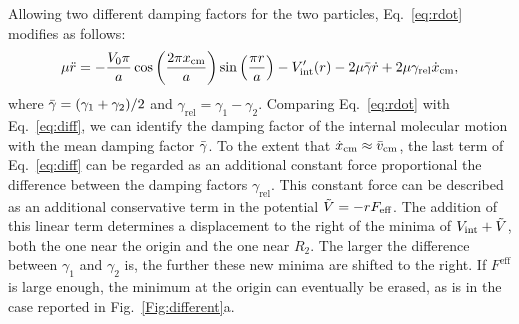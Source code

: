 
Allowing two different damping factors for the two particles, Eq.~\eqref{eq:rdot} modifies as follows:
\begin{equation}
    \mu\ddot{r} = -\frac{V_0\pi}{a}\cos \left(\frac{2\pi x_\text{cm}}{a}\right)\sin\left(\frac{\pi r}{a}\right)
    - V'_\text{int}(r) -2\mu\Bar{\gamma}\dot{r}+2\mu\gamma_\text{rel}\dot{x}_\text{cm},
    \label{eq:diff}
\end{equation}
where $\Bar{\gamma} = (\gamma_1+\gamma_2)/2$ and $\gamma_\text{rel} = \gamma_1-\gamma_2$.
Comparing Eq.~\eqref{eq:rdot} with Eq.~\eqref{eq:diff}, we can identify the damping factor of the internal molecular motion with the mean damping factor $\Bar{\gamma}$. To the extent that $\dot{x}_\text{cm} \approx \Bar{v}_\text{cm}$, the last term of Eq.~\eqref{eq:diff} can be regarded as an additional constant force proportional the difference between the damping factors $\gamma_\text{rel}$. This constant force can be described as an additional conservative term in the potential $\Tilde{V} = -rF_\text{eff}$. The addition of this linear term determines a displacement to the right of the minima of $V_\text{int} + \Tilde{V}$, both the one near the origin and the one near $R_2$. The larger the difference between $\gamma_1$ and $\gamma_2$ is, the further these new minima are shifted to the right. If $F^\text{eff}$ is large enough, the minimum at the origin can eventually be erased, as is in the case reported in Fig.~\ref{Fig:different}a. 